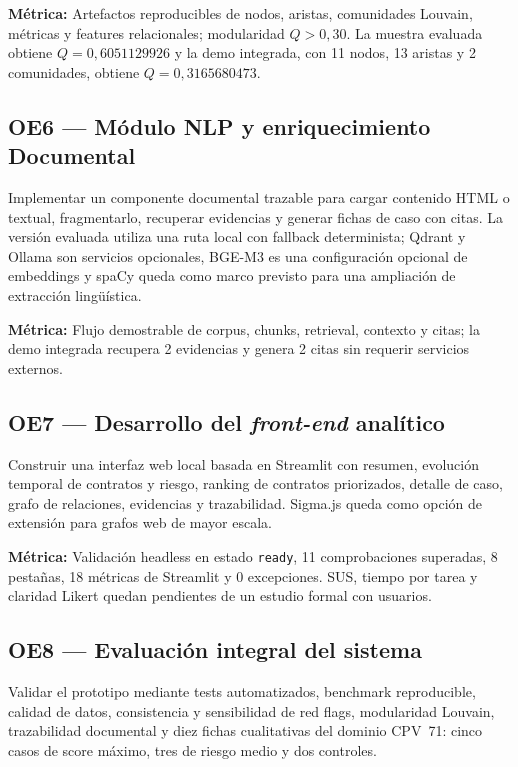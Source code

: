 \documentclass[11pt,a4paper,spanish]{book}
\numberwithin{equation}{chapter}
\numberwithin{figure}{chapter}
\begin{document}
\textbf{M{\'e}trica:} Artefactos reproducibles de nodos, aristas, comunidades Louvain, m{\'e}tricas y features relacionales; modularidad $Q>0{,}30$. La muestra evaluada obtiene $Q=0{,}6051129926$ y la demo integrada, con 11 nodos, 13 aristas y 2 comunidades, obtiene $Q=0{,}3165680473$.

\subsection*{OE6 --- M{\'o}dulo NLP y enriquecimiento Documental}
Implementar un componente documental trazable para cargar contenido HTML o textual, fragmentarlo, recuperar evidencias y generar fichas de caso con citas. La versi{\'o}n evaluada utiliza una ruta local con fallback determinista; Qdrant y Ollama son servicios opcionales, BGE-M3 es una configuraci{\'o}n opcional de embeddings y spaCy queda como marco previsto para una ampliaci{\'o}n de extracci{\'o}n ling{\"u}{\'i}stica.

\textbf{M{\'e}trica:} Flujo demostrable de corpus, chunks, retrieval, contexto y citas; la demo integrada recupera 2 evidencias y genera 2 citas sin requerir servicios externos.


\subsection*{OE7 --- Desarrollo del \textit{front-end} anal{\'i}tico}
Construir una interfaz web local basada en Streamlit con resumen, evoluci{\'o}n temporal de contratos y riesgo, ranking de contratos priorizados, detalle de caso, grafo de relaciones, evidencias y trazabilidad. Sigma.js queda como opci{\'o}n de extensi{\'o}n para grafos web de mayor escala.

\textbf{M{\'e}trica:} Validaci{\'o}n headless en estado \texttt{ready}, 11 comprobaciones superadas, 8 pesta{\~n}as, 18 m{\'e}tricas de Streamlit y 0 excepciones. SUS, tiempo por tarea y claridad Likert quedan pendientes de un estudio formal con usuarios.

\subsection*{OE8 --- Evaluaci{\'o}n integral del sistema}
Validar el prototipo mediante tests automatizados, benchmark reproducible, calidad de datos, consistencia y sensibilidad de red flags, modularidad Louvain, trazabilidad documental y diez fichas cualitativas del dominio CPV~71: cinco casos de score m{\'a}ximo, tres de riesgo medio y dos controles.
\end{document}
